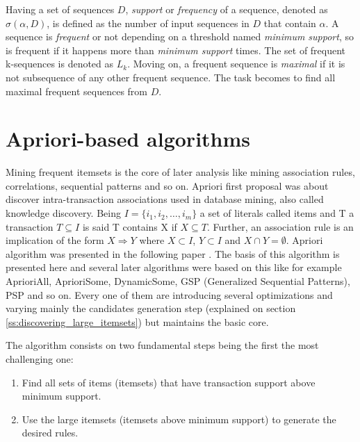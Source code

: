 Having a set of sequences $D$, {\it support} or {\it frequency} of a sequence,
denoted as $\sigma(\alpha, D)$, is defined as the number of input sequences in $D$
that contain $\alpha$. A sequence is {\it frequent} or not depending on a
threshold named {\it minimum support}, so is frequent if it happens more than
{\it minimum support} times. The set of frequent k-sequences is denoted as
$L_{k}$. Moving on, a frequent sequence is {\it maximal} if it is not subsequence
of any other frequent sequence. The task becomes to find all maximal frequent
sequences from $D$.


\section{Apriori-based algorithms}\label{ss:apriori_based}

Mining frequent itemsets is the core of later analysis like mining association
rules, correlations, sequential patterns and so on. Apriori first proposal was
about discover intra-transaction associations used
in database mining, also called knowledge discovery.
Being $I=\{i_{1}, i_{2}, \dots,i_{m}\}$ a set of literals called items and T a
transaction $T \subseteq I$ is said T contains X if $X \subseteq T$. Further, an
association rule is an implication of the form $X \Rightarrow Y$ where $X
\subset I$, $Y \subset I$ and $X \cap Y = \emptyset$. Apriori algorithm was
presented in the following paper \cite{agrawalfast}. The basis of this algorithm
is presented here and several later algorithms were based on this like for
example AprioriAll, AprioriSome, DynamicSome, GSP (Generalized Sequential
Patterns), PSP and so on. Every one of them are introducing several
optimizations and varying mainly the candidates generation step (explained on
section \ref{ss:discovering_large_itemsets}) but maintains 
the basic core.

The algorithm consists on two fundamental steps being the first the most
challenging one:
\begin{enumerate}
  \item Find all sets of items (itemsets) that have transaction support above
    minimum support.
  \item Use the large itemsets (itemsets above minimum support) to generate the
    desired rules.
\end{enumerate}

